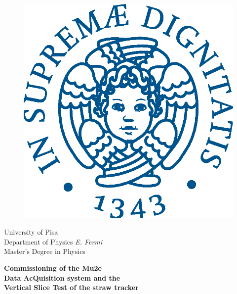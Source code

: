 \begin{titlepage}
\begin{figure}[!htb]
    \centering
    \includegraphics[keepaspectratio=true,scale=0.5]{images/Frontespizio/cherubinFrontespizio.eps}
\end{figure}

\begin{center}
    \LARGE{University of Pisa}
    \vspace{5mm}
    \\ \large{Department of Physics \textit{E. Fermi}}
    \vspace{5mm}
    \\ \LARGE{Master's Degree in Physics}
\end{center}

\vspace{15mm}
\begin{center}
    {\Large{\bf Commissioning of the Mu2e\\ \vspace{3mm} Data AcQuisition system and the\\ \vspace{5mm} Vertical Slice Test of the straw tracker}}
    
    

\end{center}
\end{titlepage}
